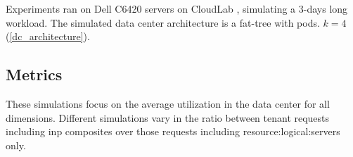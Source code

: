 Experiments ran on Dell C6420 servers on CloudLab \cite{cloudlab}, simulating a 3-days long workload. %
The simulated data center architecture is a fat-tree with
\ifdefined{} pods.
\else
$k=4$ (\autoref{dc_architecture}).
\fi

\ifdefined\THESISSUMMARY \else
\subsection{Metrics}
\fi
These simulations focus on the average  utilization in the data center for all dimensions.
Different simulations vary in the ratio between tenant requests including \gls{inp} composites over those requests including \glspl{resource:logical:server} only.